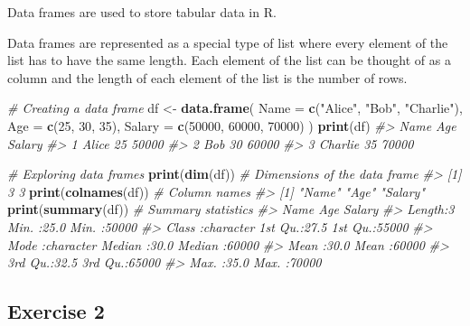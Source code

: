 \documentclass[
]{book}
\newenvironment{Shaded}{\begin{snugshade}}{\end{snugshade}}
\newcommand{\AttributeTok}[1]{\textcolor[rgb]{0.13,0.29,0.53}{#1}}
\newcommand{\CommentTok}[1]{\textcolor[rgb]{0.56,0.35,0.01}{\textit{#1}}}
\newcommand{\DecValTok}[1]{\textcolor[rgb]{0.00,0.00,0.81}{#1}}
\newcommand{\FunctionTok}[1]{\textcolor[rgb]{0.13,0.29,0.53}{\textbf{#1}}}
\newcommand{\NormalTok}[1]{#1}
\newcommand{\OtherTok}[1]{\textcolor[rgb]{0.56,0.35,0.01}{#1}}
\newcommand{\StringTok}[1]{\textcolor[rgb]{0.31,0.60,0.02}{#1}}
\begin{document}
Data frames are used to store tabular data in R.

Data frames are represented as a special type of list where every element of the list has to have the same length. Each element of the list can be thought of as a column and the length of each element of the list is the number of rows.

\begin{Shaded}
\begin{Highlighting}[]
\CommentTok{\# Creating a data frame}
\NormalTok{df }\OtherTok{\textless{}{-}} \FunctionTok{data.frame}\NormalTok{(}
  \AttributeTok{Name =} \FunctionTok{c}\NormalTok{(}\StringTok{"Alice"}\NormalTok{, }\StringTok{"Bob"}\NormalTok{, }\StringTok{"Charlie"}\NormalTok{),}
  \AttributeTok{Age =} \FunctionTok{c}\NormalTok{(}\DecValTok{25}\NormalTok{, }\DecValTok{30}\NormalTok{, }\DecValTok{35}\NormalTok{),}
  \AttributeTok{Salary =} \FunctionTok{c}\NormalTok{(}\DecValTok{50000}\NormalTok{, }\DecValTok{60000}\NormalTok{, }\DecValTok{70000}\NormalTok{)}
\NormalTok{)}
\FunctionTok{print}\NormalTok{(df)}
\CommentTok{\#\textgreater{}      Name Age Salary}
\CommentTok{\#\textgreater{} 1   Alice  25  50000}
\CommentTok{\#\textgreater{} 2     Bob  30  60000}
\CommentTok{\#\textgreater{} 3 Charlie  35  70000}

\CommentTok{\# Exploring data frames}
\FunctionTok{print}\NormalTok{(}\FunctionTok{dim}\NormalTok{(df))  }\CommentTok{\# Dimensions of the data frame}
\CommentTok{\#\textgreater{} [1] 3 3}
\FunctionTok{print}\NormalTok{(}\FunctionTok{colnames}\NormalTok{(df))  }\CommentTok{\# Column names}
\CommentTok{\#\textgreater{} [1] "Name"   "Age"    "Salary"}
\FunctionTok{print}\NormalTok{(}\FunctionTok{summary}\NormalTok{(df))  }\CommentTok{\# Summary statistics}
\CommentTok{\#\textgreater{}      Name                Age           Salary     }
\CommentTok{\#\textgreater{}  Length:3           Min.   :25.0   Min.   :50000  }
\CommentTok{\#\textgreater{}  Class :character   1st Qu.:27.5   1st Qu.:55000  }
\CommentTok{\#\textgreater{}  Mode  :character   Median :30.0   Median :60000  }
\CommentTok{\#\textgreater{}                     Mean   :30.0   Mean   :60000  }
\CommentTok{\#\textgreater{}                     3rd Qu.:32.5   3rd Qu.:65000  }
\CommentTok{\#\textgreater{}                     Max.   :35.0   Max.   :70000}
\end{Highlighting}
\end{Shaded}

\subsection*{Exercise 2}\label{exercise-2-1}
\end{document}
